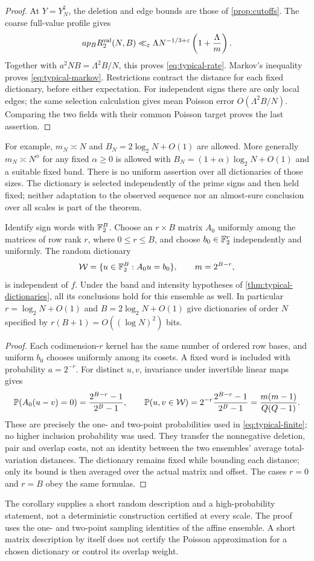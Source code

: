 \begin{proof}
At $Y=Y_N^\sharp$, the deletion and edge bounds are those of
\cref{prop:cutoffs}. The coarse full-value profile gives
\[
 ap_BR_2^{\rm val}(N,B)
 \ll_\varepsilon \Lambda N^{-1/3+\varepsilon}
                           \left(1+\frac{\Lambda}{m}\right).
\]
Together with $a^2NB=\Lambda^2B/N$, this proves
\eqref{eq:typical-rate}. Markov's inequality proves
\eqref{eq:typical-markov}. Restrictions contract the distance for each
fixed dictionary, before either expectation. For independent signs there
are only local edges; the same selection calculation gives mean Poisson
error $O(\Lambda^2B/N)$. Comparing the two fields with their common
Poisson target proves the last assertion.
\end{proof}
For example, $m_N\asymp N$ and $B_N=2\log_2N+O(1)$ are allowed.
More generally $m_N\asymp N^\alpha$ for any fixed $\alpha\ge0$ is
allowed with $B_N=(1+\alpha)\log_2N+O(1)$ and a suitable fixed band.
There is no uniform assertion over all dictionaries of those sizes.
The dictionary is selected independently of the prime signs and then
held fixed; neither adaptation to the observed sequence nor an
almost-sure conclusion over all scales is part of the theorem.

\begin{corollary}\label{cor:affine-dictionaries}
Identify sign words with $\mathbb F_2^B$. Choose an $r\times B$ matrix $A_0$
uniformly among the matrices of row rank $r$, where $0\le r\le B$,
and choose $b_0\in\mathbb F_2^r$ independently and uniformly. The random dictionary
\[
 \mathcal W=\{u\in\mathbb F_2^B:A_0u=b_0\},\qquad m=2^{B-r},
\]
is independent of $f$. Under the band and intensity hypotheses of
\cref{thm:typical-dictionaries}, all its conclusions hold for this
ensemble as well. In particular $r=\log_2N+O(1)$ and
$B=2\log_2N+O(1)$ give dictionaries of order $N$ specified by
$r(B+1)=O((\log N)^2)$ bits.
\end{corollary}
\begin{proof}
Each codimension-$r$ kernel has the same number of ordered row bases,
and uniform $b_0$ chooses uniformly among its cosets. A fixed word is
included with probability $a=2^{-r}$. For distinct $u,v$, invariance
under invertible linear maps gives
\[
 \mathbb P(A_0(u-v)=0)=\frac{2^{B-r}-1}{2^B-1},\qquad
 \mathbb P(u,v\in\mathcal W)=2^{-r}\frac{2^{B-r}-1}{2^B-1}
                      =\frac{m(m-1)}{Q(Q-1)}.
\]
These are precisely the one- and two-point probabilities used in
\eqref{eq:typical-finite}; no higher inclusion probability was used.
They transfer the nonnegative deletion, pair and overlap costs, not an
identity between the two ensembles' average total-variation distances.
The dictionary remains fixed while bounding each distance; only its
bound is then averaged over the actual matrix and offset.
The cases $r=0$ and $r=B$ obey the same formulas.
\end{proof}
The corollary supplies a short random description and a high-probability
statement, not a deterministic construction certified at every scale.
The proof uses the one- and two-point sampling identities of the affine
ensemble. A short matrix description by itself does not certify the
Poisson approximation for a chosen dictionary or control its overlap
weight.

